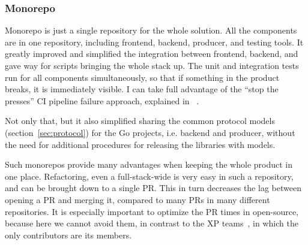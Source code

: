 \subsubsection{Monorepo}\label{sec:monorepo}

Monorepo is just a single repository
for the whole solution.
All the components are in one repository,
including frontend,
backend,
producer, and
testing tools.
It greatly improved and simplified
the integration between frontend, backend,
and gave way for scripts
bringing the whole stack up.
The unit and integration tests run for all
components simultaneously,
so that if something in the product breaks,
it is immediately visible.
I can take full advantage of the
``stop the presses'' \ac{CI} pipeline failure approach,
explained in ~\cite{martin_clean_2011}.

Not only that,
but it also simplified sharing
the common protocol models (section~\ref{sec:protocol})
for the Go projects, i.e. backend and producer,
without the need for additional procedures
for releasing the libraries with models.

Such monorepos provide many advantages
when keeping the whole product in one place.
Refactoring,
even a full-stack-wide
is very easy in such a repository,
and can be brought down to a single \ac{PR}.
This in turn decreases the lag between
opening a \ac{PR} and merging it,
compared to many \acp{PR} in many different repositories.
It is especially important
to optimize the \ac{PR} times in open-source,
because here we cannot avoid them,
in contrast to the \ac{XP} teams~\cite{beck_extreme_2004},
in which the only contributors are its members.
